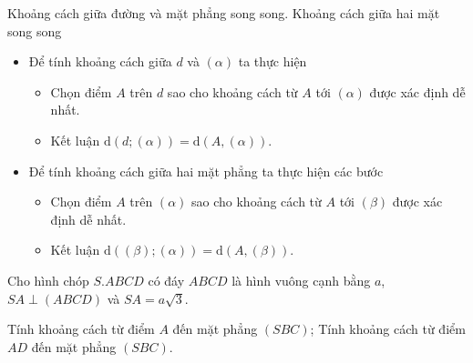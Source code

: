 \begin{dang}{Khoảng cách giữa đường và mặt phẳng song song. Khoảng cách giữa hai mặt song song}
	\begin{itemize}
		\item [\iconCH]  Để tính khoảng cách giữa $d$ và $(\alpha)$ ta thực hiện
		\begin{itemize}
			\item Chọn điểm $A$ trên $d$ sao cho khoảng cách từ $A$ tới $(\alpha)$ được xác định dễ nhất.
			\item Kết luận $\mathrm{d}(d; (\alpha))=\mathrm{d}(A, (\alpha))$.
		\end{itemize}
		\item [\iconCH]  Để tính khoảng cách giữa hai mặt phẳng ta thực hiện các bước
		\begin{itemize}
			\item Chọn điểm $A$ trên $(\alpha)$ sao cho khoảng cách từ $A$ tới $(\beta)$ được xác định dễ nhất.
			\item Kết luận $\mathrm{d}((\beta); (\alpha))=\mathrm{d}(A, (\beta))$.
		\end{itemize}
	\end{itemize}
\end{dang}

\begin{vd}
	Cho hình chóp $S.ABCD$ có đáy $ABCD$ là hình vuông cạnh bằng $a$, $SA \perp (ABCD)$ và $SA=a\sqrt{3}$.
	\begin{tasks}
		\task Tính khoảng cách từ điểm $A$ đến mặt phẳng $(SBC)$;
		\task Tính khoảng cách từ điểm $AD$ đến mặt phẳng $(SBC)$.
	\end{tasks}
\end{vd}

